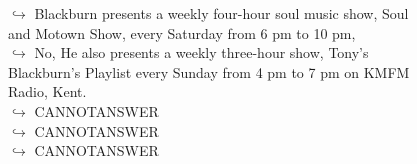 \documentclass[11pt,a4paper, onecolumn]{article}
\begin{document}
\begin{figure}[t] \small \begin{tcolorbox}[boxsep=0pt,left=5pt,right=0pt,top=2pt,colback = yellow!5] \begin{dialogue}
 \small 
\colorbox{pink!25}{$\hookrightarrow$}
{ Blackburn presents a weekly four-hour soul music show, Soul and Motown Show, every Saturday from 6 pm to 10 pm, }
\\
\colorbox{pink!25}{$\hookrightarrow$}
\colorbox{red!25}{No,}
{ He also presents a weekly three-hour show, Tony's Blackburn's Playlist every Sunday from 4 pm to 7 pm on KMFM Radio, Kent. }
\\
\colorbox{pink!25}{$\hookrightarrow$}
{ CANNOTANSWER }
\\
\colorbox{pink!25}{$\hookrightarrow$}
{ CANNOTANSWER }
\\
\colorbox{pink!25}{$\hookrightarrow$}
{ CANNOTANSWER }
\\
 \end{dialogue}\end{tcolorbox}\end{figure}
\end{document}
